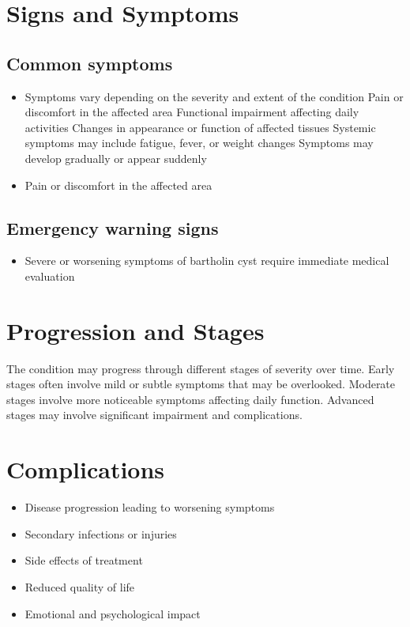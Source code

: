 \section{Signs and Symptoms}

\subsection{Common symptoms}
\begin{itemize}[noitemsep]
  \item Symptoms vary depending on the severity and extent of the condition Pain or discomfort in the affected area Functional impairment affecting daily activities Changes in appearance or function of affected tissues Systemic symptoms may include fatigue, fever, or weight changes Symptoms may develop gradually or appear suddenly
  \item Pain or discomfort in the affected area
  \end{itemize}

\subsection{Emergency warning signs}
\begin{itemize}[noitemsep]
  \item Severe or worsening symptoms of bartholin cyst require immediate medical evaluation
\end{itemize}
\section{Progression and Stages}
The condition may progress through different stages of severity over time. Early stages often involve mild or subtle symptoms that may be overlooked. Moderate stages involve more noticeable symptoms affecting daily function. Advanced stages may involve significant impairment and complications.
\section{Complications}
\begin{itemize}[noitemsep]
  \item Disease progression leading to worsening symptoms
  \item Secondary infections or injuries
  \item Side effects of treatment
  \item Reduced quality of life
  \item Emotional and psychological impact
\end{itemize}
